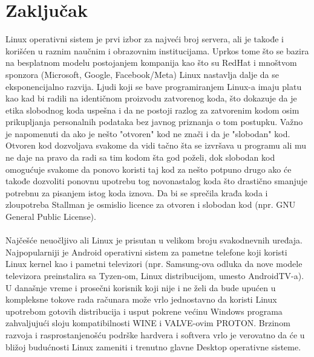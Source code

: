\documentclass[a4paper,14pt]{article}
\begin{document}
\section{Zaključak}
Linux operativni sistem je prvi izbor za najveći broj servera, ali je takođe i korišćen u raznim naučnim i obrazovnim institucijama. Uprkos tome što se bazira na besplatnom modelu postojanjem kompanija kao što su RedHat i mnoštvom sponzora (Microsoft, Google, Facebook/Meta) Linux nastavlja dalje da se eksponencijalno razvija. Ljudi koji se bave programiranjem Linux-a imaju platu kao kad bi radili na identičnom proizvodu zatvorenog koda, što dokazuje da je etika slobodnog koda uspešna i da ne postoji razlog za zatvorenim kodom osim prikupljanja personalnih podataka bez javnog priznanja o tom postupku. Važno je napomenuti da ako je nešto "otvoren" kod ne znači i da je "slobodan" kod. Otvoren kod dozvoljava svakome da vidi tačno šta se izvršava u programu ali mu ne daje na pravo da radi sa tim kodom šta god poželi, dok slobodan kod omogućuje svakome da ponovo koristi taj kod za nešto potpuno drugo ako će takođe dozvoliti ponovnu upotrebu tog novonastalog koda što drastično smanjuje potrebnu za pisanjem istog koda iznova. Da bi se sprečila krađa koda i zloupotreba Stallman je osmislio licence za otvoren i slobodan kod (npr. GNU General Public License\cite{gpl}).
\\\\
Najčešće neuočljivo ali Linux je prisutan u velikom broju svakodnevnih uređaja. Najpopularniji je Android operativni sistem za pametne telefone koji koristi Linux kernel kao i pametni televizori (npr. Samsung-ova odluka da nove modele televizora preinstalira sa Tyzen-om, Linux distribucijom, umesto AndroidTV-a). U današnje vreme i prosečni korisnik koji nije i ne želi da bude upućen u kompleksne tokove rada računara može vrlo jednostavno da koristi Linux upotrebom gotovih distribucija i usput pokrene većinu Windows programa zahvaljujući sloju kompatibilnosti WINE i VALVE-ovim PROTON. Brzinom razvoja i rasprostanjenošću podrške hardvera i softvera vrlo je verovatno da će u bližoj budućnosti Linux zameniti i trenutno glavne Desktop operativne sisteme.
\newpage

\renewcommand\refname{Literatura}


\newpage
\end{document}
